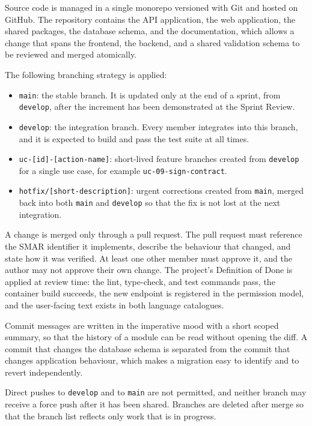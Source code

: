 Source code is managed in a single monorepo versioned with Git and hosted on GitHub. The repository contains the API application, the web application, the shared packages, the database schema, and the documentation, which allows a change that spans the frontend, the backend, and a shared validation schema to be reviewed and merged atomically.

The following branching strategy is applied:

\begin{itemize}
    \item \texttt{main}: the stable branch. It is updated only at the end of a sprint, from \texttt{develop}, after the increment has been demonstrated at the Sprint Review.
    \item \texttt{develop}: the integration branch. Every member integrates into this branch, and it is expected to build and pass the test suite at all times.
    \item \texttt{uc-[id]-[action-name]}: short-lived feature branches created from \texttt{develop} for a single use case, for example \texttt{uc-09-sign-contract}.
    \item \texttt{hotfix/[short-description]}: urgent corrections created from \texttt{main}, merged back into both \texttt{main} and \texttt{develop} so that the fix is not lost at the next integration.
\end{itemize}

A change is merged only through a pull request. The pull request must reference the SMAR identifier it implements, describe the behaviour that changed, and state how it was verified. At least one other member must approve it, and the author may not approve their own change. The project's Definition of Done is applied at review time: the lint, type-check, and test commands pass, the container build succeeds, the new endpoint is registered in the permission model, and the user-facing text exists in both language catalogues.

Commit messages are written in the imperative mood with a short scoped summary, so that the history of a module can be read without opening the diff. A commit that changes the database schema is separated from the commit that changes application behaviour, which makes a migration easy to identify and to revert independently.

Direct pushes to \texttt{develop} and to \texttt{main} are not permitted, and neither branch may receive a force push after it has been shared. Branches are deleted after merge so that the branch list reflects only work that is in progress.

